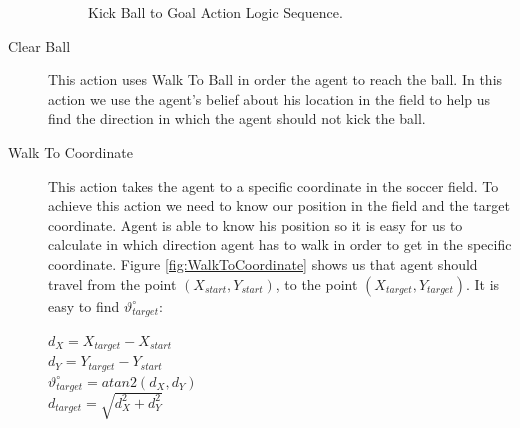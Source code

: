 \begin{description}
\begin{figure}[!h]
  \caption{Kick Ball to Goal Action Logic Sequence.}
  \label{fig:GoKickBallToGoal}
\end{figure}
 \item[Clear Ball] This action uses Walk To Ball in order the agent to reach the ball. In this action we use the agent's belief about his location in the field to help us find the direction in which the agent should not kick the ball.
 \item[Walk To Coordinate]
 This action takes the agent to a specific coordinate in the soccer field. To achieve this action we need to know our position in the field and the target coordinate. Agent is able to know his position so it is easy for us to calculate in which direction agent has to walk in order to get in the specific coordinate. Figure \ref{fig:WalkToCoordinate} shows us that agent should travel from the point $(X_{start},Y_{start})$, to the point $(X_{target},Y_{target})$. It is easy to find $\vartheta_{target}^{\circ}$:\\
\begin{center}
$d_{X} = X_{target} - X_{start}$\\
$d_{Y} = Y_{target} - Y_{start}$\\
$\vartheta_{target}^{\circ} = atan2(d_{X},d_{Y})$\\
$d_{target} = \sqrt{d_{X}^2 + d_{Y}^2}$
\end{center}


\end{description}
